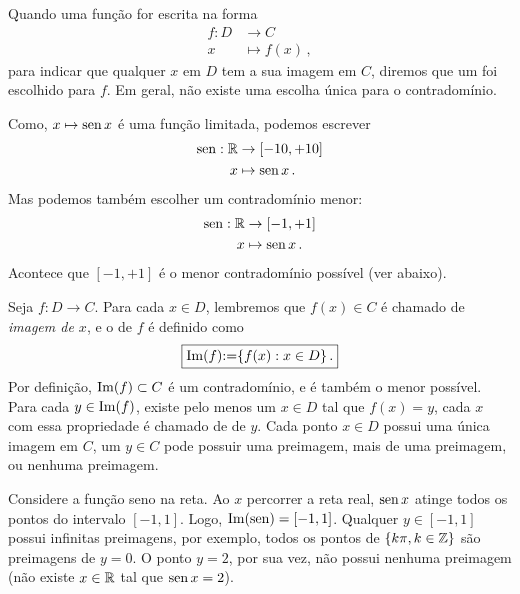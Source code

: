 Quando uma função for escrita na forma 
\begin{align*}
f:D&\to C\\
x&\mapsto f(x)\,,
\end{align*}
para indicar que qualquer $x$ em $D$ tem a sua imagem em $C$, diremos que um
 foi escolhido para $f$. Em geral, não existe uma escolha única para
o contradomínio.

\begin{ex}
Como, $x\mapsto \operatorname{sen} x$ é uma função limitada, podemos escrever 
\begin{align}
\operatorname{sen}:\mathbb{R}&\to [-10,+10]\label{eq:contradomsen}\\
x&\mapsto \operatorname{sen} x\,.\nonumber
\end{align}
Mas podemos também escolher um contradomínio menor:
\begin{align}
\operatorname{sen}:\mathbb{R}&\to [-1,+1]\label{eq:contradomsen}\\
x&\mapsto \operatorname{sen} x\,.\nonumber
\end{align}
Acontece que $[-1,+1]$ é o menor contradomínio possível (ver abaixo).
\end{ex}


 Seja $f:D\to C$. Para cada $x\in D$, lembremos que $f(x)\in C$ é chamado de \emph{imagem
de $x$}, e o
 de $f$ é definido como
$$\boxed{\operatorname{Im}(f){:=} \{f(x):x\in D\}\,.}$$
Por definição, $\operatorname{Im}(f)\subset C$ é um contradomínio, e é também o menor possível.
Para cada $y\in \operatorname{Im}(f)$, existe pelo menos um $x\in D$ tal que $f(x)=y$, cada $x$ com
essa propriedade é chamado de  de $y$. 
 Cada ponto $x\in D$ possui uma única imagem em $C$, um $y\in C$ pode possuir uma
preimagem, mais de uma preimagem, ou nenhuma preimagem.

\begin{ex}
Considere a função seno na reta.
 Ao $x$ percorrer a reta real, $\operatorname{sen} x$ atinge todos os pontos do intervalo $[-1,1]$. Logo,
$\operatorname{Im}(\operatorname{sen})=[-1,1]$. Qualquer $y\in [-1,1]$ possui infinitas preimagens, por exemplo,
todos os pontos de $\{k\pi,k\in \mathbb{Z}\}$ são preimagens de 
 $y=0$. O ponto $y=2$, por sua vez, não possui nenhuma preimagem (não existe $x\in \mathbb{R}$
tal que $\operatorname{sen} x=2$).
\end{ex}

